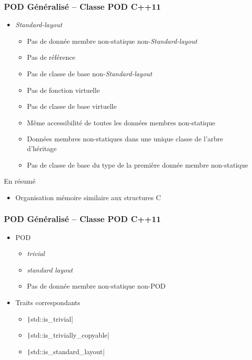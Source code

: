 \documentclass[C++.tex]{subfiles}
\begin{document}
\begin{frame}[fragile]
	\frametitle{POD Généralisé -- Classe POD C++11}
	\begin{itemize}
		\item \textit{Standard-layout}
		\begin{itemize}
			\item Pas de donnée membre non-statique non-\textit{Standard-layout} 
			\item Pas de référence
			\item Pas de classe de base non-\textit{Standard-layout}
			\item Pas de fonction virtuelle 
			\item Pas de classe de base virtuelle
			\item Même accessibilité de toutes les données membres non-statique
			\item Données membres non-statiques dans une unique classe de l'arbre d'héritage
			\item Pas de classe de base du type de la première donnée membre non-statique
		\end{itemize}
	\end{itemize}

	\begin{block}{En résumé}
		\begin{itemize}
			\item Organisation mémoire similaire aux structures C
		\end{itemize}
	\end{block}
\end{frame}

\begin{frame}[fragile]
	\frametitle{POD Généralisé -- Classe POD C++11}
	\begin{itemize}
		\item POD
		\begin{itemize}
			\item \textit{trivial}
			\item \textit{standard layout}
			\item Pas de donnée membre non-statique non-POD
		\end{itemize}
		\item Traits correspondants 
		\begin{itemize}
			\item \texttt|std::is_trivial|
			\item \texttt|std::is_trivially_copyable|
			\item \texttt|std::is_standard_layout|
		\end{itemize}
	\end{itemize}
\end{frame}
\end{document}
